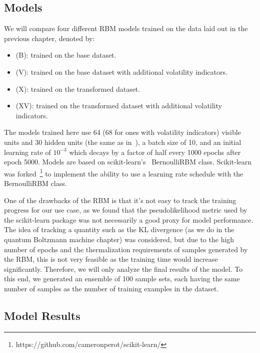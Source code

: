 \subsection{Models}
We will compare four different RBM models trained on the data laid out in the previous chapter, denoted by:
\begin{itemize}
    \item (B): trained on the base dataset.
    \item (V): trained on the base dataset with additional volatility indicators.
    \item (X): trained on the transformed dataset.
    \item (XV): trained on the transformed dataset with additional volatility indicators.
\end{itemize}
The models trained here use 64 (68 for ones with volatility indicators) visible units and 30 hidden units (the same as in~\cite{kondratyev_2019}), a batch size of 10, and an initial learning rate of \( 10^{-3} \) which decays by a factor of half every 1000 epochs after epoch 5000.
Models are based on scikit-learn's~\cite{python_sklearn} BernoulliRBM class.
Scikit-learn was forked~\footnote{https://github.com/cameronperot/scikit-learn/} to implement the ability to use a learning rate schedule with the BernoulliRBM class.

One of the drawbacks of the RBM is that it's not easy to track the training progress for our use case, as we found that the pseudolikelihood metric used by the scikit-learn package was not necessarily a good proxy for model performance.
The idea of tracking a quantity such as the KL divergence (as we do in the quantum Boltzmann machine chapter) was considered, but due to the high number of epochs and the thermalization requirements of samples generated by the RBM, this is not very feasible as the training time would increase significantly.
Therefore, we will only analyze the final results of the model.
To this end, we generated an ensemble of 100 sample sets, each having the same number of samples as the number of training examples in the dataset.

\subsection{Model Results}
